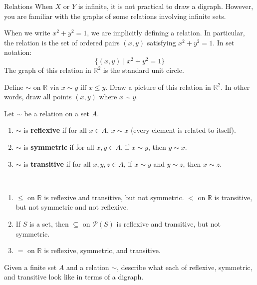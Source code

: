 \begin{section}{Relations}
When $X$ or $Y$ is infinite, it is not practical to draw a digraph.  However, you are familiar with the graphs of some relations involving infinite sets.

\begin{example}
When we write $x^2+y^2=1$, we are implicitly defining a relation.  In particular, the relation is the set of ordered pairs $(x,y)$ satisfying $x^2+y^2=1$.  In set notation:
\[
\{(x,y)\mid x^2+y^2=1\}
\]
The graph of this relation in $\mathbb{R}^2$ is the standard unit circle.
\end{example}

\begin{exercise}
Define $\sim$ on $\mathbb{R}$ via $x\sim y$ iff $x\leq y$.  Draw a picture of this relation in $\mathbb{R}^2$. In other words, draw all points $(x,y)$ where $x\sim y$.
\end{exercise}

\begin{definition}
Let $\sim$ be a relation on a set $A$.
\begin{enumerate}[label=\textrm{(\alph*)}]
\item $\sim$ is \textbf{reflexive} if for all $x\in A$, $x\sim x$ (every element is related to itself).
\item $\sim$ is \textbf{symmetric} if for all $x,y\in A$, if $x\sim y$, then $y\sim x$.
\item $\sim$ is \textbf{transitive} if for all $x,y,z\in A$, if $x\sim y$ and $y\sim z$, then $x\sim z$.
\end{enumerate}
\end{definition}

\begin{example}\
\begin{enumerate}[label=\textrm{(\alph*)}]
\item $\leq$ on $\mathbb{R}$ is reflexive and transitive, but not symmetric.
$<$ on $\mathbb{R}$ is transitive, but not symmetric and not reflexive.
\item If $S$ is a set, then $\subseteq$ on $\mathcal{P}(S)$ is reflexive and transitive, but not symmetric.
\item $=$ on $\mathbb{R}$ is reflexive, symmetric, and transitive.
\end{enumerate}

\end{example}

\begin{exercise}
Given a finite set $A$ and a relation $\sim$, describe what each of reflexive, symmetric, and transitive look like in terms of a digraph.
\end{exercise}


\end{section}
